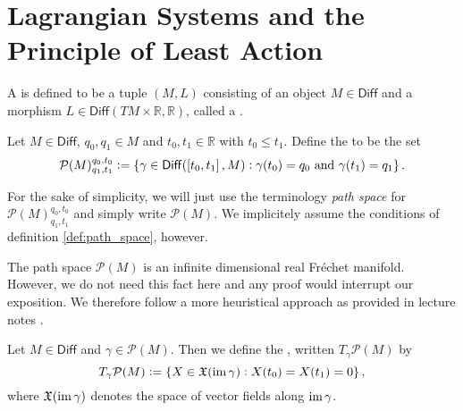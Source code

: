 \section*{Lagrangian Systems and the Principle of Least Action}

\begin{definition}
	A  is defined to be a tuple $(M,L)$ consisting of an object $M \in \mathsf{Diff}$ and a morphism $L \in \mathsf{Diff}(TM \times \mathbb{R},\mathbb{R})$, called a .
\end{definition}

\begin{definition}
	\label{def:path_space}
	Let $M \in \mathsf{Diff}$, $q_0,q_1 \in M$ and $t_0, t_1 \in \mathbb{R}$ with $t_0 \leq t_1$. Define the  to be the set
	\begin{equation}
		\label{eq:path_space}
		\mathcal{P}(M)^{q_0,t_0}_{q_1,t_1} := \cbr[0]{\gamma \in \mathsf{Diff}(\intcc[0]{t_0,t_1},M) : \gamma(t_0) = q_0 \text{ and } \gamma(t_1) = q_1}.
			\end{equation}
\end{definition}

\begin{remark}
	For the sake of simplicity, we will just use the terminology \emph{path space} for $\mathcal{P}(M)^{q_0,t_0}_{q_1,t_1}$ and simply write $\mathcal{P}(M)$. We implicitely assume the conditions of definition \ref{def:path_space}, however.
\end{remark}

The path space $\mathcal{P}(M)$ is an infinite dimensional real Fr\'echet manifold. However, we do not need this fact here and any proof would interrupt our exposition. We therefore follow a more heuristical approach as provided in lecture notes \cite[168--169]{salamon:dg:2018}.

\begin{definition}
	Let $M \in \mathsf{Diff}$ and $\gamma \in \mathcal{P}(M)$. Then we define the , written $T_\gamma\mathcal{P}(M)$ by
	\begin{equation*}
		T_\gamma\mathcal{P}(M) := \cbr[0]{X \in \mathfrak{X}(\im \gamma) : X(t_0) = X(t_1) = 0},
	\end{equation*}
	\noindent where $\mathfrak{X}(\operatorname{im} \gamma)$ denotes the space of vector fields along $\operatorname{im} \gamma$.
\end{definition}

